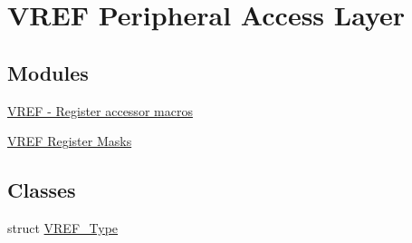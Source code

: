 \hypertarget{group__VREF__Peripheral__Access__Layer}{}\section{V\+R\+EF Peripheral Access Layer}
\label{group__VREF__Peripheral__Access__Layer}
\subsection*{Modules}
\begin{DoxyCompactItemize}
\item 
\hyperlink{group__VREF__Register__Accessor__Macros}{V\+R\+E\+F -\/ Register accessor macros}
\item 
\hyperlink{group__VREF__Register__Masks}{V\+R\+E\+F Register Masks}
\end{DoxyCompactItemize}
\subsection*{Classes}
\begin{DoxyCompactItemize}
\item 
struct \hyperlink{structVREF__Type}{V\+R\+E\+F\+\_\+\+Type}
\end{DoxyCompactItemize}

